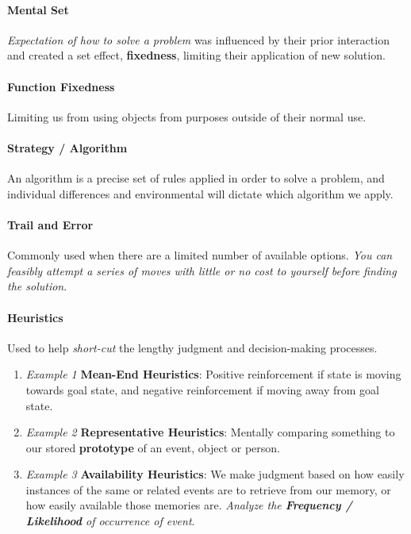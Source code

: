 \documentclass{article}
\begin{document}
	\paragraph{Mental Set} \emph{Expectation of how to solve a problem} was influenced by their prior interaction and created a set effect, \textbf{fixedness}, limiting their application of new solution.

	\paragraph{Function Fixedness} Limiting us from using objects from purposes outside of their normal use.

	\paragraph{Strategy / Algorithm} An algorithm is a precise set of rules applied in order to solve a problem, and individual differences and environmental will dictate which algorithm we apply.

	\paragraph{Trail and Error} Commonly used when there are a limited number of available options. \emph{You can feasibly attempt a series of moves with little or no cost to yourself before finding the solution}.

	\paragraph{Heuristics} Used to help \emph{short-cut} the lengthy judgment and decision-making processes.
	\begin{enumerate}
		\item \emph{Example 1} \textbf{Mean-End Heuristics}: Positive reinforcement if state is moving towards goal state, and negative reinforcement if moving away from goal state.
		\item \emph{Example 2} \textbf{Representative Heuristics}: Mentally comparing something to our stored \textbf{prototype} of an event, object or person.
		\item \emph{Example 3} \textbf{Availability Heuristics}: We make judgment based on how easily instances of the same or related events are to retrieve from our memory, or how easily available those memories are. \emph{Analyze the \textbf{Frequency / Likelihood} of occurrence of event}.
	\end{enumerate}
\end{document}
